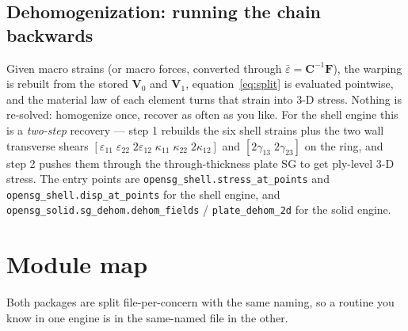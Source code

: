 \subsection{Dehomogenization: running the chain backwards}

Given macro strains (or macro forces, converted through
$\bar\varepsilon = \mathbf{C}^{-1}\mathbf{F}$), the warping is rebuilt from the
stored $\mathbf{V}_0$ and $\mathbf{V}_1$, equation~\eqref{eq:split} is evaluated
pointwise, and the material law of each element turns that strain into 3-D
stress. Nothing is re-solved: homogenize once, recover as often as you like. For
the shell engine this is a \emph{two-step} recovery --- step 1 rebuilds the six
shell strains plus the two wall transverse shears
$[\varepsilon_{11}\;\varepsilon_{22}\;2\varepsilon_{12}\;\kappa_{11}\;\kappa_{22}\;2\kappa_{12}]$
and $[2\gamma_{13}\;2\gamma_{23}]$ on the ring, and step 2 pushes them through
the through-thickness plate SG to get ply-level 3-D stress. The entry points are
\texttt{opensg\_shell.stress\_at\_points} and
\texttt{opensg\_shell.disp\_at\_points} for the shell engine, and
\texttt{opensg\_solid.sg\_dehom.dehom\_fields} / \texttt{plate\_dehom\_2d} for
the solid engine.

\section{Module map}
\label{sec:module-map}

Both packages are split file-per-concern with the same naming, so a routine you
know in one engine is in the same-named file in the other.

